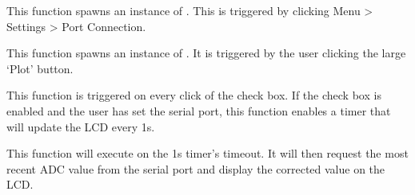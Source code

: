 \documentclass[letterpaper,10pt,english]{sphinxmanual}
\begin{document}
\begin{fulllineitems}
\begin{fulllineitems}
\end{fulllineitems}


\begin{fulllineitems}
\label{\detokenize{mainWindow:mainWindow.Ui_MainWindow.open_settings_port}}
This function spawns an instance of . This is triggered by
clicking Menu \textgreater{} Settings \textgreater{} Port Connection.

\end{fulllineitems}


\begin{fulllineitems}
\label{\detokenize{mainWindow:mainWindow.Ui_MainWindow.show_plot}}
This function spawns an instance of . It is triggered by
the user clicking the large ‘Plot’ button.

\end{fulllineitems}


\begin{fulllineitems}
\label{\detokenize{mainWindow:mainWindow.Ui_MainWindow.toggle_timer}}
This function is triggered on every click of the check box. If the check box is enabled and
the user has set the serial port, this function enables a timer that will update the LCD every 1s.

\end{fulllineitems}


\begin{fulllineitems}
\label{\detokenize{mainWindow:mainWindow.Ui_MainWindow.update_display}}
This function will execute on the 1s timer’s timeout. It will then request the most recent ADC value
from the serial port and display the corrected value on the LCD.

\end{fulllineitems}


\end{fulllineitems}
\end{document}
